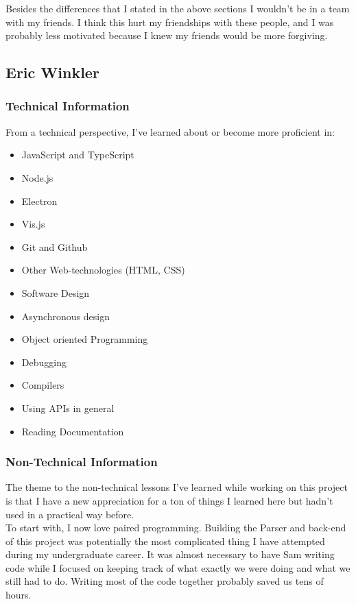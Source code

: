 \documentclass[letterpaper,10pt,titlepage,draftclsnofoot,onecolumn,onesided] {IEEEtran}
\begin{document}
Besides the differences that I stated in the above sections I wouldn't be in a team with my friends. 
I think this hurt my friendships with these people, and I was probably less motivated because I knew my friends would be more forgiving. 


\subsection{Eric Winkler}

\subsubsection{Technical Information}
From a technical perspective, I've learned about or become more proficient in:
\begin{itemize}
    \item JavaScript and TypeScript
    \item Node.js
    \item Electron
    \item Vis.js
    \item Git and Github
    \item Other Web-technologies (HTML, CSS)
    \item Software Design
    \item Asynchronous design
    \item Object oriented Programming
    \item Debugging
    \item Compilers
    \item Using APIs in general
    \item Reading Documentation \\
\end{itemize} 

\subsubsection{Non-Technical Information}
The theme to the non-technical lessons I've learned while working on this project is that I have a new appreciation for a ton of things I learned here but hadn't used in a practical way before. \\

To start with, I now love paired programming. 
Building the Parser and back-end of this project was potentially the most complicated thing I have attempted during my undergraduate career. 
It was almost necessary to have Sam writing code while I focused on keeping track of what exactly we were doing and what we still had to do. 
Writing most of the code together probably saved us tens of hours. \\
\end{document}
